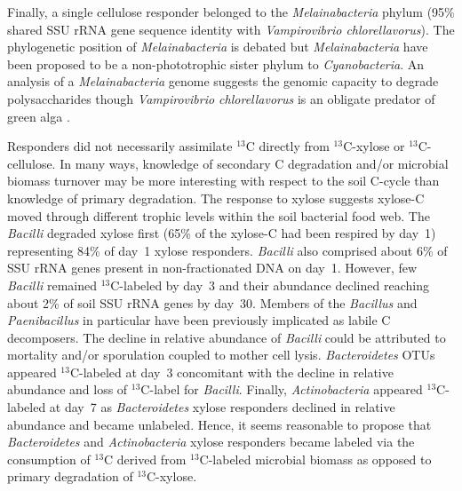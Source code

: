 Finally, a single cellulose responder belonged to the \textit{Melainabacteria}
phylum (95\% shared SSU rRNA gene sequence identity with \textit{Vampirovibrio
chlorellavorus}). The phylogenetic position of \textit{Melainabacteria} is
debated but \textit{Melainabacteria} have been proposed to be
a non-phototrophic sister phylum to \textit{Cyanobacteria}. An analysis of
a \textit{Melainabacteria} genome \citep{Di_Rienzi_2013} suggests the
genomic capacity to degrade polysaccharides though \textit{Vampirovibrio
chlorellavorus} is an obligate predator of green alga \citep{gromov_1972}.

Responders did not necessarily assimilate $^{13}$C directly
from $^{13}$C-xylose or $^{13}$C-cellulose. In many ways, knowledge of
secondary C degradation and/or microbial biomass turnover may be more
interesting with respect to the soil C-cycle than knowledge of primary
degradation. The response to xylose suggests xylose-C moved through different
trophic levels within the soil bacterial food web. The \textit{Bacilli}
degraded xylose first (65\% of the xylose-C had been respired by day~1)
representing 84\% of day~1 xylose responders. \textit{Bacilli} also comprised
about 6\% of SSU rRNA genes present in non-fractionated DNA on day~1. However,
few \textit{Bacilli} remained $^{13}$C-labeled by day~3 and their abundance
declined reaching about 2\% of soil SSU rRNA genes by day~30. Members of the
\textit{Bacillus} \citep{Cleveland2007} and \textit{Paenibacillus} in
particular \citep{Verastegui_2014} have been previously implicated as labile
C decomposers. The decline in relative abundance of \textit{Bacilli} could be
attributed to mortality and/or sporulation coupled to mother cell lysis.
\textit{Bacteroidetes} OTUs appeared $^{13}$C-labeled at day~3 concomitant with
the decline in relative abundance and loss of $^{13}$C-label for
\textit{Bacilli}. Finally, \textit{Actinobacteria} appeared $^{13}$C-labeled at
day~7 as \textit{Bacteroidetes} xylose responders declined in relative
abundance and became unlabeled. Hence, it seems reasonable to propose that
\textit{Bacteroidetes} and \textit{Actinobacteria} xylose responders became
labeled via the consumption of $^{13}$C derived from $^{13}$C-labeled microbial
biomass as opposed to primary degradation of $^{13}$C-xylose. 

